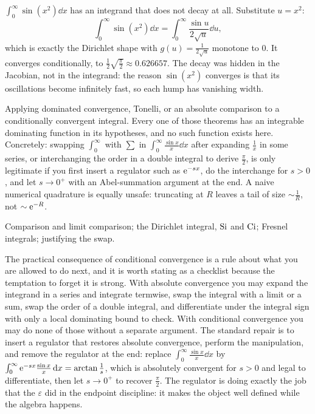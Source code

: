 \begin{worked}
$\displaystyle\int_0^{\infty}\sin(x^{2})\dd x$ has an integrand that does not decay at all. Substitute $u=x^{2}$:
\[\int_0^{\infty}\sin(x^{2})\dd x=\int_0^{\infty}\frac{\sin u}{2\sqrt u}\dd u,\]
which is exactly the Dirichlet shape with $g(u)=\tfrac{1}{2\sqrt u}$ monotone to $0$. It converges conditionally, to $\tfrac12\sqrt{\tfrac{\pi}{2}}\approx0.626657$. The decay was hidden in the Jacobian, not in the integrand: the reason $\sin(x^{2})$ converges is that its oscillations become infinitely fast, so each hump has vanishing width.
\end{worked}

\begin{trap}
Applying dominated convergence, Tonelli, or an absolute comparison to a conditionally convergent integral. Every one of those theorems has an integrable dominating function in its hypotheses, and no such function exists here. Concretely: swapping $\int_0^{\infty}$ with $\sum$ in $\int_0^{\infty}\tfrac{\sin x}{x}\dd x$ after expanding $\tfrac1x$ in some series, or interchanging the order in a double integral to derive $\tfrac{\pi}{2}$, is only legitimate if you first insert a regulator such as $\mathrm{e}^{-sx}$, do the interchange for $s>0$, and let $s\to0^{+}$ with an Abel-summation argument at the end. A naive numerical quadrature is equally unsafe: truncating at $R$ leaves a tail of size $\sim\tfrac{1}{R}$, not $\sim\mathrm{e}^{-R}$.
\end{trap}

\begin{seealsob}Comparison and limit comparison; the Dirichlet integral, $\operatorname{Si}$ and $\operatorname{Ci}$; Fresnel integrals; justifying the swap.\end{seealsob}

The practical consequence of conditional convergence is a rule about what you are allowed to do next, and it is worth stating as a checklist because the temptation to forget it is strong. With absolute convergence you may expand the integrand in a series and integrate termwise, swap the integral with a limit or a sum, swap the order of a double integral, and differentiate under the integral sign with only a local dominating bound to check. With conditional convergence you may do none of those without a separate argument. The standard repair is to insert a regulator that restores absolute convergence, perform the manipulation, and remove the regulator at the end: replace $\int_0^{\infty}\tfrac{\sin x}{x}\dd x$ by $\int_0^{\infty}\mathrm{e}^{-sx}\tfrac{\sin x}{x}\,\mathrm{d} x=\arctan\tfrac1s$, which is absolutely convergent for $s>0$ and legal to differentiate, then let $s\to0^{+}$ to recover $\tfrac{\pi}{2}$. The regulator is doing exactly the job that the $\varepsilon$ did in the endpoint discipline: it makes the object well defined while the algebra happens.


